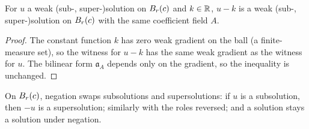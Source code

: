 \begin{theorem}
\label{thm:IsSubsolution_sub_const_ball}
\leanok
{}
For $u$ a weak (sub-, super-)solution on $B_{r}(c)$ and $k \in \mathbb{R}$, $u - k$ is a weak (sub-, super-)solution on $B_{r}(c)$ with the same coefficient field $A$.
\end{theorem}

\begin{proof}
\leanok
{}

The constant function $k$ has zero weak gradient on the ball (a finite-measure set), so the witness for $u - k$ has the same weak gradient as the witness for $u$. The bilinear form $\mathfrak{a}_A$ depends only on the gradient, so the inequality is unchanged.
\end{proof}

\begin{theorem}
\label{thm:IsSubsolution_neg_ball}
\leanok
{}
On $B_{r}(c)$, negation swaps subsolutions and supersolutions: if $u$ is a subsolution, then $-u$ is a supersolution; similarly with the roles reversed; and a solution stays a solution under negation.
\end{theorem}

